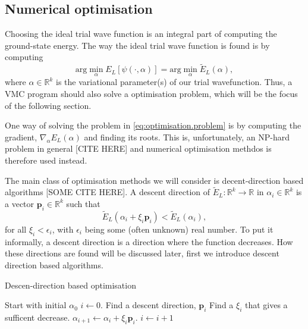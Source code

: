 \documentclass[11pt,a4paper]{article}
\numberwithin{equation}{section}
\begin{document}
\subsection{Numerical optimisation}
Choosing the ideal trial wave function is an integral part of computing the ground-state energy. The way the ideal trial wave function is found is by computing
\begin{equation}
    \text{arg} \min_{\alpha} E_L[\psi(\cdot, \alpha)] = \text{arg} \min_{\alpha} \tilde{E}_L(\alpha), \label{eq:optimisation.problem}
\end{equation}
where $\alpha \in \mathbb{R}^k$ is the variational parameter(s) of our trial wavefunction. Thus, a VMC program should also solve a optimisation problem, which will be the focus of the following section.

One way of solving the problem in \cref{eq:optimisation.problem} is by computing the gradient, $\nabla_\alpha E_L(\alpha)$ and finding its roots. This is, unfortunately, an NP-hard problem in general [CITE HERE] and numerical optimisation methdos is therefore used instead.

The main class of optimisation methods we will consider is decent-direction based algorithms [SOME CITE HERE]. A descent direction of $\tilde{E}_L: \mathbb{R}^k \to \mathbb{R}$ in $\alpha_i \in \mathbb{R}^k$ is a vector $\bm{p}_i \in \mathbb{R}^k$ such that
\begin{equation}
    \tilde{E}_L(\alpha_i + \xi_i \bm{p}_i) < \tilde{E}_L(\alpha_i),
\end{equation}
for all $\xi_i < \epsilon_i$, with $\epsilon_i$ being some (often unknown) real number. To put it informally, a descent direction is a direction where the function decreases. How these directions are found will be discussed later, first we introduce descent direction based algorithms.

\begin{algorithm}
	\caption{Descen-direction based optimisation}
	\label{Alg:descentOptimisation}
	\begin{algorithmic}[1]
        \State Start with initial $\alpha_0$
        \State $i \gets 0$.
        \State Find a descent direction, $\bm{p}_i$
        \State Find a $\xi_i$ that gives a sufficent decrease.
        \State $\alpha_{i+1} \gets \alpha_i + \xi_i \bm{p}_i$.
        \State $i \gets i + 1$
        \EndWhile
		\EndProcedure
	\end{algorithmic}
\end{algorithm}
\end{document}

